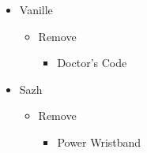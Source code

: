 \begin{menu}
\begin{itemize}
    \equip
    \begin{itemize}
        \item Vanille
        \begin{itemize}
            \item Remove
            \begin{itemize}
                \item Doctor's Code
            \end{itemize}
        \end{itemize}
        \item Sazh
        \begin{itemize}
            \item Remove
            \begin{itemize}
                \item Power Wristband
            \end{itemize}
        \end{itemize}
    \end{itemize}
\end{itemize}
\end{menu}